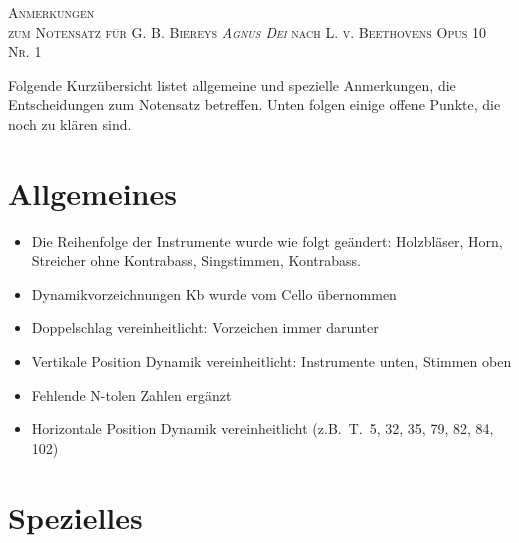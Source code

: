\documentclass[a4paper,9pt]{extarticle}
\begin{document}
\thispagestyle{empty}

{\centering \textsc{\LARGE Anmerkungen}\\
\textsc{zum Notensatz für G. B. Biereys \textsl{\textsc{Agnus Dei}} nach L. v. Beethovens Opus 10 Nr. 1} \par}
\bigskip

Folgende Kurzübersicht listet allgemeine und spezielle Anmerkungen, die Entscheidungen zum Notensatz betreffen.
Unten folgen einige offene Punkte, die noch zu klären sind.

\section{Allgemeines}
\begin{itemize}
\item Die Reihenfolge der Instrumente wurde wie folgt geändert: Holzbläser, Horn, Streicher ohne Kontrabass, Singstimmen, Kontrabass.
\item Dynamikvorzeichnungen Kb wurde vom Cello übernommen
\item Doppelschlag vereinheitlicht: Vorzeichen immer darunter
\item Vertikale Position Dynamik vereinheitlicht: Instrumente unten, Stimmen oben
\item Fehlende N-tolen Zahlen ergänzt
\item Horizontale Position Dynamik vereinheitlicht (z.B.\ T.\ 5, 32, 35, 79, 82, 84, 102)
\end{itemize}

\section{Spezielles}
\end{document}
